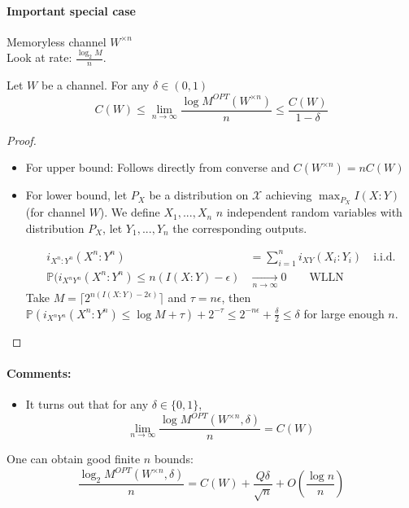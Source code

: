 \paragraph{Important special case} Memoryless channel $W^{\times n}$\\
Look at rate: $\frac{\log_2 M}{n}$.


\begin{thm}
Let $W$ be a channel. For any $\delta \in (0,1)$
\[C(W)\leq \lim_{n\to \infty} \frac{\log M^{OPT}(W^{\times n})}{n}\leq \frac{C(W)}{1-\delta}\]
\end{thm}

\begin{proof}
\begin{itemize}
\item For upper bound: Follows directly from converse and $C(W^{\times n})=nC(W)$
\item For lower bound, let $P_X$ be a distribution on $\mathcal{X}$ achieving $\max_{P_X} I(X:Y)$ (for channel $W$). We define $X_1,...,X_n$ $n$ independent random variables with distribution $P_X$, let $Y_1,...,Y_n$ the corresponding outputs.

\begin{align*}
i_{X^n:Y^n}(X^n:Y^n) & =\sum_{i=1}^n i_{XY}(X_i:Y_i) \quad\text{i.i.d.}\\
\mathbb{P}(i_{X^nY^n}(X^n:Y^n) \leq n(I(X:Y)-\epsilon ) & \underset{n \to \infty}{\to} 0 \qquad \text{WLLN}
\end{align*}
Take $M=\lceil 2^{n(I(X:Y)-2\epsilon)}\rceil$ and $\tau=n\epsilon$, then $\mathbb{P}(i_{X^nY^n}(X^n:Y^n)\leq \log M + \tau ) + 2^{-\tau} \leq 2^{-n\epsilon} + \frac{\delta}{2}\leq \delta$ for large enough $n$. 
\end{itemize}
\end{proof}

\paragraph{Comments:\\}
\begin{itemize}
\item It turns out that for any $\delta \in \{0,1\}$,
\[\lim_{n\to \infty} \frac{\log M^{OPT}(W^{\times n},\delta)}{n}=C(W)\]
\end{itemize}
\item One can obtain good finite $n$ bounds:
\[\frac{\log_2M^{OPT}(W^{\times n},\delta)}{n}=C(W)+\frac{Q\delta}{\sqrt{n}}+O(\frac{\log n}{n})\]


